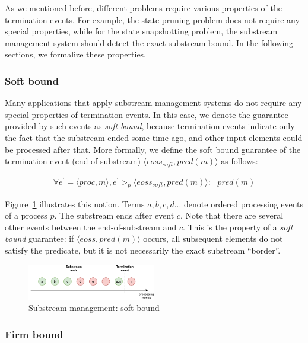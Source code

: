 As we mentioned before, different problems require various properties of the termination events. For example, the state pruning problem does not require any special properties, while for the state snapshotting problem, the substream management system should detect the exact substream bound. In the following sections, we formalize these properties. 

\subsubsection{Soft bound}

Many applications that apply substream management systems do not require any special properties of termination events. In this case, we denote the guarantee provided by such events as {\em soft bound}, because termination events indicate only the fact that the substream ended some time ago, and other input elements could be processed after that. More formally, we define the soft bound guarantee of the termination event (end-of-substream) $\langle eoss_{soft}, pred(m)\rangle$ as follows:

\begin{align*}
\forall e^{'} = \langle proc,m\rangle, e^{'} >_p \langle eoss_{soft}, pred(m)\rangle : \neg pred(m)
\end{align*}

Figure~\ref{general_guarantees} illustrates this notion. Terms $a,b,c,d...$ denote ordered processing events of a process $p$. The substream ends after event $c$. Note that there are several other events between the end-of-substream and $c$. This is the property of a {\em soft bound} guarantee: if $\langle eoss, pred(m)\rangle$ occurs, all subsequent elements do not satisfy the predicate, but it is not necessarily the exact substream ``border''.

\begin{figure}[htbp]
  \centering
  \includegraphics[width=0.50\textwidth]{pics/general-guarantee.pdf}
  \caption{Substream management: soft bound}
  \label{general_guarantees}
\end{figure}

\subsubsection{Firm bound}

